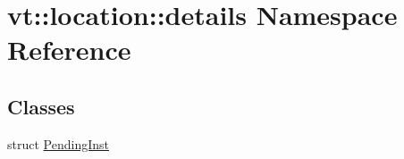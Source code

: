 \hypertarget{namespacevt_1_1location_1_1details}{}\section{vt\+:\+:location\+:\+:details Namespace Reference}
\label{namespacevt_1_1location_1_1details}
\subsection*{Classes}
\begin{DoxyCompactItemize}
\item 
struct \hyperlink{structvt_1_1location_1_1details_1_1_pending_inst}{Pending\+Inst}
\end{DoxyCompactItemize}
